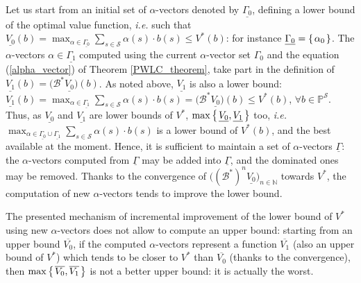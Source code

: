 Let us start from an initial set of $\alpha$-vectors 
denoted by $\underline{\Gamma_0}$, defining a lower bound of the optimal value function,
\textit{i.e.} such that $\underline{V_0}(b) 
= \max_{\alpha \in \underline{\Gamma_0}} \sum_{s \in \mathcal{S}} \alpha(s) \cdot b(s) \leqslant V^*(b)$: 
for instance $\underline{\Gamma_0} = \left\{ \left.  \alpha_0  \right. \right\}$. 
The $\alpha$-vectors $\alpha \in \underline{\Gamma_1}$ computed using the 
current $\alpha$-vector set $\Gamma_0$
and the equation (\ref{alpha_vector}) of Theorem \ref{PWLC_theorem},
take part in the definition of $\underline{V_1}(b) = \Big( \mathcal{B}^* \underline{V_0} \Big)(b)$.
As noted above, $\underline{V_1}$ is also a lower bound: $\underline{V_1}(b) 
= \max_{\alpha \in \underline{\Gamma_1}} \sum_{s \in \mathcal{S}} \alpha(s) \cdot b(s) 
= \Big( \mathcal{B}^* \underline{V_0} \Big) (b) \leqslant V^*(b)$, 
$\forall b \in \mathbb{P}^{\mathcal{S}}$.
Thus, as $\underline{V_0}$ and $\underline{V_1}$
are lower bounds of $V^*$, $\max \left\{ \left. \underline{V_0}, \underline{V_1} \right. \right\}$ too,
\textit{i.e.} $\max_{\alpha \in \underline{\Gamma_0} \cup \underline{\Gamma_1}} \sum_{s \in \mathcal{S}} \alpha(s) \cdot b(s)$
is a lower bound of $V^*(b)$, and the best available at the moment.
Hence, it is sufficient to maintain a set of $\alpha$-vectors $\underline{\Gamma}$:
the $\alpha$-vectors computed from $\underline{\Gamma}$ may be added into $\underline{\Gamma}$, 
and the dominated ones may be removed.
Thanks to the convergence of $\Big( (\mathcal{B}^*)^n \underline{V_0} \Big)_{n \in \mathbb{N}}$ towards $V^*$, 
the computation of new $\alpha$-vectors tends to improve the lower bound.

The presented mechanism of incremental improvement
of the lower bound of $V^*$
using new $\alpha$-vectors 
does not allow to compute an upper bound:
starting from an upper bound $\overline{V_0}$,
if the computed $\alpha$-vectors represent
a function $\overline{V_1}$ (also an upper bound of $V^*$)
which tends to be closer to $V^*$ than $\overline{V_0}$ (thanks to the convergence), 
then $\max \left\{ \left.  \overline{V_0}, \overline{V_1}   \right. \right\}$
is not a better upper bound: it is actually the worst.

